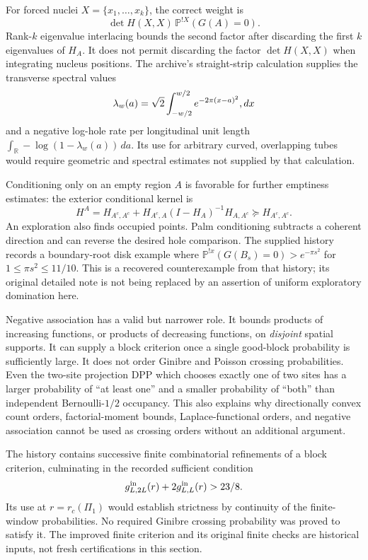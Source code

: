 \documentclass[11pt,a4paper]{article}
\theoremstyle{definition}
\theoremstyle{remark}
\numberwithin{equation}{section}
\begin{document}
For forced nuclei $X=\{x_1,\ldots,x_k\}$, the correct weight is
\[
 \det H(X,X)\,
 \mathbb P^{!X}(G(A)=0).
\]
Rank-$k$ eigenvalue interlacing bounds the second factor after discarding
the first $k$ eigenvalues of $H_A$.  It does not permit discarding the
factor $\det H(X,X)$ when integrating nucleus positions.  The archive's
straight-strip calculation supplies the transverse spectral values
\[
 \lambda_w(a)=\sqrt2\int_{-w/2}^{w/2}e^{-2\pi(x-a)^2}\\,dx
\]
and a negative log-hole rate per longitudinal unit length
$\int_{\mathbb R}-\log(1-\lambda_w(a))\,da$.  Its use for arbitrary
curved, overlapping tubes would require geometric and spectral estimates
not supplied by that calculation.

Conditioning only on an empty region $A$ is favorable for further
emptiness estimates: the exterior conditional kernel is
\[
 H^A=H_{A^c,A^c}+H_{A^c,A}(I-H_A)^{-1}H_{A,A^c}
 \succeq H_{A^c,A^c}.
\]
An exploration also finds occupied points.  Palm conditioning subtracts
a coherent direction and can reverse the desired hole comparison.  The
supplied history records a boundary-root disk example where
$\mathbb P^{!x}(G(B_s)=0)>e^{-\pi s^2}$ for
$1\leq\pi s^2\leq11/10$.  This is a recovered counterexample from that
history; its original detailed note is not being replaced by an assertion
of uniform exploratory domination here.

Negative association has a valid but narrower role.  It bounds products
of increasing functions, or products of decreasing functions, on
\emph{disjoint} spatial supports.  It can supply a block criterion once a
single good-block probability is sufficiently large.  It does not order
Ginibre and Poisson crossing probabilities.  Even the two-site projection
DPP which chooses exactly one of two sites has a larger probability of
``at least one'' and a smaller probability of ``both'' than independent
Bernoulli-$1/2$ occupancy.  This also explains why directionally convex
count orders, factorial-moment bounds, Laplace-functional orders, and
negative association cannot be used as crossing orders without an
additional argument.

The history contains successive finite combinatorial refinements of a
block criterion, culminating in the recorded sufficient condition
\[
 g_{L,2L}^{\rm in}(r)+2g_{L,L}^{\rm in}(r)>23/8.
\]
Its use at $r=r_c(\Pi_1)$ would establish strictness by continuity of the
finite-window probabilities.  No required Ginibre crossing probability
was proved to satisfy it.  The improved finite criterion and its original
finite checks are historical inputs, not fresh certifications in this
section.
\end{document}
